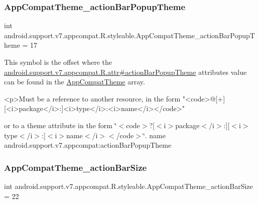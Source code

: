 \subsubsection{\texorpdfstring{App\+Compat\+Theme\+\_\+action\+Bar\+Popup\+Theme}{AppCompatTheme\_actionBarPopupTheme}}
{\footnotesize\ttfamily int android.\+support.\+v7.\+appcompat.\+R.\+styleable.\+App\+Compat\+Theme\+\_\+action\+Bar\+Popup\+Theme = 17\hspace{0.3cm}{\ttfamily [static]}}

This symbol is the offset where the \hyperlink{classandroid_1_1support_1_1v7_1_1appcompat_1_1R_1_1attr_a2b592c6f7020c21bbbc10b803f74ec6d}{android.\+support.\+v7.\+appcompat.\+R.\+attr\#action\+Bar\+Popup\+Theme} attribute\textquotesingle{}s value can be found in the \hyperlink{classandroid_1_1support_1_1v7_1_1appcompat_1_1R_1_1styleable_a5c42f89e8a410c323be34208d75c430b}{App\+Compat\+Theme} array.

\begin{DoxyVerb}      <p>Must be a reference to another resource, in the form "<code>@[+][<i>package</i>:]<i>type</i>:<i>name</i></code>"
\end{DoxyVerb}
 or to a theme attribute in the form \char`\"{}$<$code$>$?\mbox{[}$<$i$>$package$<$/i$>$\+:\mbox{]}\mbox{[}$<$i$>$type$<$/i$>$\+:\mbox{]}$<$i$>$name$<$/i$>$$<$/code$>$\char`\"{}.  name android.\+support.\+v7.\+appcompat\+:action\+Bar\+Popup\+Theme \mbox{\label{classandroid_1_1support_1_1v7_1_1appcompat_1_1R_1_1styleable_a52ac1f860eda81cb2958b695309ae510}} 
\subsubsection{\texorpdfstring{App\+Compat\+Theme\+\_\+action\+Bar\+Size}{AppCompatTheme\_actionBarSize}}
{\footnotesize\ttfamily int android.\+support.\+v7.\+appcompat.\+R.\+styleable.\+App\+Compat\+Theme\+\_\+action\+Bar\+Size = 22\hspace{0.3cm}{\ttfamily [static]}}

